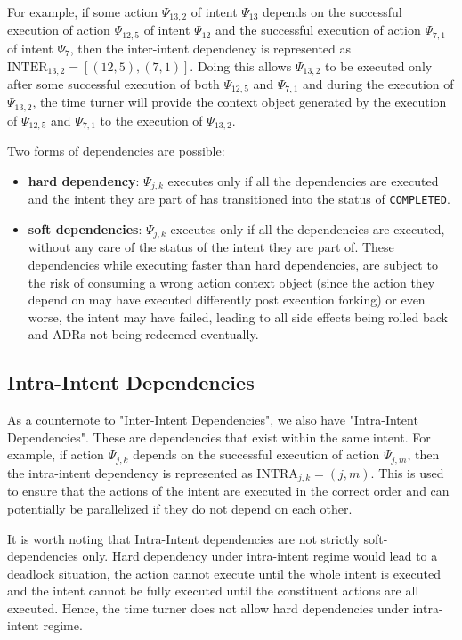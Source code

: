 For example, if some action $\Psi_{13, 2}$ of intent $\Psi_{13}$ depends on the successful execution of action $\Psi_{12, 5}$ of intent $\Psi_{12}$ and the successful execution of action $\Psi_{7, 1}$ of intent $\Psi_{7}$, then the inter-intent dependency is represented as $\text{INTER}_{13, 2} = [(12, 5), (7, 1)]$. Doing this allows $\Psi_{13, 2}$ to be executed only after some successful execution of both $\Psi_{12, 5}$ and $\Psi_{7, 1}$ and during the execution of $\Psi_{13, 2}$, the time turner will provide the context object generated by the execution of $\Psi_{12, 5}$ and $\Psi_{7, 1}$ to the execution of $\Psi_{13, 2}$.

Two forms of dependencies are possible: 
\begin{itemize}
    \item \textbf{hard dependency}: $\Psi_{j, k}$ executes only if all the dependencies are executed and the intent they are part of has transitioned into the status of \texttt{COMPLETED}.
    \item \textbf{soft dependencies}: $\Psi_{j, k}$ executes only if all the dependencies are executed, without any care of the status of the intent they are part of. These dependencies while executing faster than hard dependencies, are subject to the risk of consuming a wrong action context object (since the action they depend on may have executed differently post execution forking) or even worse, the intent may have failed, leading to all side effects being rolled back and ADRs not being redeemed eventually.
\end{itemize}


\subsection{Intra-Intent Dependencies}
As a counternote to "Inter-Intent Dependencies", we also have "Intra-Intent Dependencies". These are dependencies that exist within the same intent. For example, if action $\Psi_{j, k}$ depends on the successful execution of action $\Psi_{j, m}$, then the intra-intent dependency is represented as $\text{INTRA}_{j, k} = (j, m)$. This is used to ensure that the actions of the intent are executed in the correct order and can potentially be parallelized if they do not depend on each other.

It is worth noting that Intra-Intent dependencies are not strictly soft-dependencies only. Hard dependency under intra-intent regime would lead to a deadlock situation, the action cannot execute until the whole intent is executed and the intent cannot be fully executed until the constituent actions are all executed. Hence, the time turner does not allow hard dependencies under intra-intent regime.

